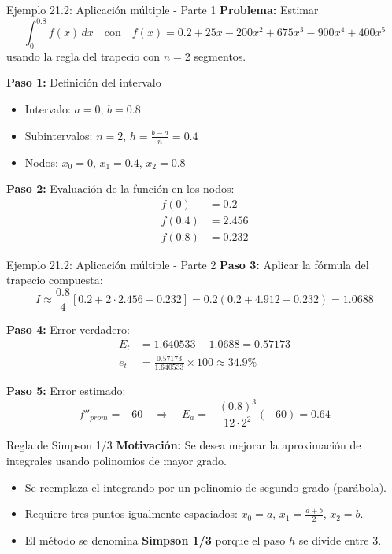 \documentclass[main.tex]{subfiles}
\begin{document}
\begin{frame}{Ejemplo 21.2: Aplicación múltiple - Parte 1}
\textbf{Problema:} Estimar
\[ \int_0^{0.8} f(x)\,dx \quad \text{con} \quad f(x) = 0.2 + 25x - 200x^2 + 675x^3 - 900x^4 + 400x^5 \]
usando la regla del trapecio con \(n = 2\) segmentos.

\textbf{Paso 1:} Definición del intervalo
\begin{itemize}
  \item Intervalo: \(a = 0\), \(b = 0.8\)
  \item Subintervalos: \(n = 2\), \(h = \frac{b - a}{n} = 0.4\)
  \item Nodos: \(x_0 = 0\), \(x_1 = 0.4\), \(x_2 = 0.8\)
\end{itemize}

\textbf{Paso 2:} Evaluación de la función en los nodos:
\begin{align*}
  f(0) &= 0.2 \\
  f(0.4) &= 2.456 \\
  f(0.8) &= 0.232
\end{align*}
\end{frame}

\begin{frame}{Ejemplo 21.2: Aplicación múltiple - Parte 2}
\textbf{Paso 3:} Aplicar la fórmula del trapecio compuesta:
\[ I \approx \frac{0.8}{4} [0.2 + 2\cdot2.456 + 0.232] = 0.2 (0.2 + 4.912 + 0.232) = 1.0688 \]

\textbf{Paso 4:} Error verdadero:
\begin{align*}
  E_t &= 1.640533 - 1.0688 = 0.57173 \\
  e_t &= \frac{0.57173}{1.640533} \times 100 \approx 34.9\%
\end{align*}

\textbf{Paso 5:} Error estimado:
\[ f''_{prom} = -60 \quad \Rightarrow \quad E_a = -\frac{(0.8)^3}{12 \cdot 2^2} (-60) = 0.64 \]
\end{frame}

\begin{frame}{Regla de Simpson 1/3}
\textbf{Motivación:} Se desea mejorar la aproximación de integrales usando polinomios de mayor grado.

\begin{itemize}
  \item Se reemplaza el integrando por un polinomio de segundo grado (parábola).
  \item Requiere tres puntos igualmente espaciados: $x_0 = a$, $x_1 = \frac{a + b}{2}$, $x_2 = b$.
  \item El método se denomina \textbf{Simpson 1/3} porque el paso $h$ se divide entre 3.
\end{itemize}
\end{frame}
\end{document}
